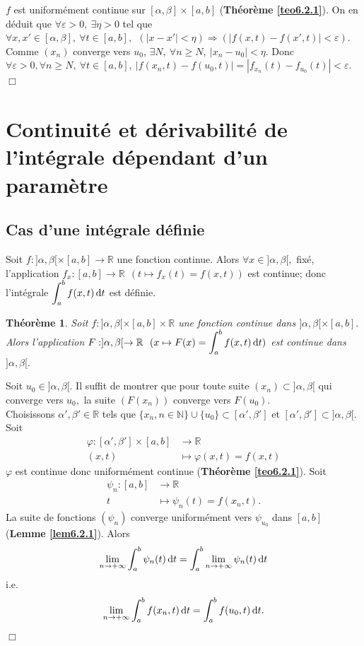 \documentclass[11pt, a4paper]{book}
\newtheorem{teo}{Th\'eor\`eme}[section]
\newenvironment{pr}{\noindent {\bf Preuve} \noindent} {\hfill $\Box$\vskip 5mm}
\begin{document}
\begin{pr}\quad $f$ est uniform\'ement continue sur $[\alpha,\beta]\times[a,b]$ (\textbf{Th\'eor\`eme \ref{teo6.2.1}}). On en d\'eduit que $\forall \varepsilon >0,~\exists\eta>0$ tel que $\forall x,x'\in [\alpha,\beta], ~\forall t\in [a,b],~~(|x-x'|<\eta)\Rightarrow(|f(x,t)-f(x',t)|<\varepsilon).$\\
Comme $(x_n)$ converge vers $u_0$, $\exists N,~\forall n\geq N,~|x_n-u_0|<\eta.$ Donc $\forall \varepsilon>0,\forall n\geq N,~\forall t\in [a,b],~|f(x_n,t)-f(u_0,t)|=|f_{x_n}(t)-f_{u_0}(t)|<\varepsilon.$
\end{pr} 
\section{Continuit\'e et d\'erivabilit\'e de l'int\'egrale d\'ependant d'un param\`etre}
\subsection{Cas d'une int\'egrale d\'efinie}
Soit $f:]\alpha,\beta[\times[a,b]\rightarrow\mathbb{R}$ une fonction continue. Alors $\forall x\in ]\alpha,\beta[,$ fix\'e, l'application $f_x:[a,b]\rightarrow\mathbb{R}~~(t\mapsto f_x(t)=f(x,t))$ est continue; donc l'int\'egrale ${\displaystyle \int_a^b f(x,t)\,\mathrm{d} t}$ est d\'efinie.
\begin{teo}	\label{teo6.3.1} Soit $f:]\alpha,\beta[\times[a,b]\times\mathbb{R}$ une fonction continue dans $]\alpha,\beta[\times[a,b].$\\ Alors l'application ${\displaystyle F:]\alpha,\beta[\rightarrow\mathbb{R}~~(x\mapsto F(x)=\int_a^bf(x,t)\,\mathrm{d} t)}$ est continue dans $]\alpha,\beta[.$
\end{teo}
\begin{pr}\quad
Soit $u_0\in ]\alpha,\beta[.$ Il suffit de montrer que pour toute suite $(x_n)\subset]\alpha,\beta[$ qui converge vers $u_0,$ la suite $(F(x_n))$ converge vers $F(u_0)$.\\
Choisissons $\alpha',\beta'\in \mathbb{R}$ tels que $\{x_n,n\in \mathbb{N}\}\cup\{u_0\}\subset[\alpha',\beta']$ et $[\alpha',\beta']\subset]\alpha,\beta[.$ Soit \begin{align*}
\varphi:[\alpha',\beta']\times[a,b]&\rightarrow \mathbb{R}\\ (x,t)&\mapsto \varphi(x,t)=f(x,t)
\end{align*}
$\varphi$ est continue donc uniform\'ement continue (\textbf{Th\'eor\`eme \ref{teo6.2.1}}). Soit \begin{align*}
\psi_n:[a,b]&\rightarrow\mathbb{R}\\ t&\mapsto \psi_n(t)=f(x_n,t).
\end{align*}
La suite de fonctions $(\psi_n)$ converge uniform\'ement vers $\psi_{u_0}$ dans $[a,b]$ (\textbf{Lemme \ref{lem6.2.1}}). Alors $$ \lim_{n\rightarrow+\infty}\int_a^b\psi_{n}(t)\,\mathrm{d} t=\int_a^b\lim_{n\rightarrow+\infty}\psi_n(t)\,\mathrm{d} t$$ i.e. $$\lim_{n\rightarrow+\infty}\int_a^bf(x_n,t)\,\mathrm{d} t=\int_a^bf(u_0,t)\,\mathrm{d} t.$$
\end{pr}
\end{document}
